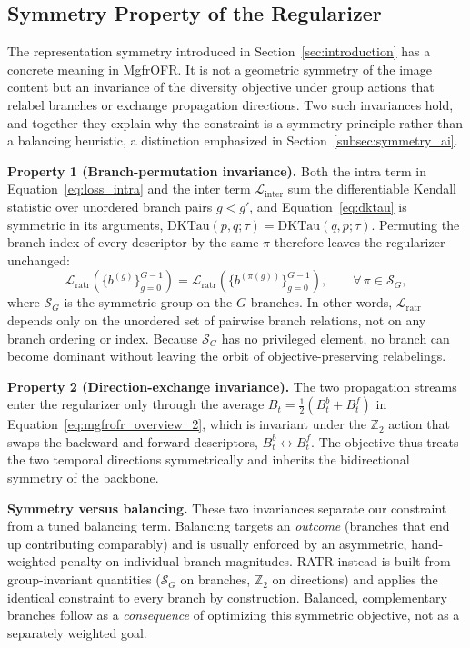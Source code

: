 \subsection{Symmetry Property of the Regularizer}
\label{subsec:symmetry_property}

The representation symmetry introduced in Section~\ref{sec:introduction} has a concrete meaning in MgfrOFR. It is not a geometric symmetry of the image content but an invariance of the diversity objective under group actions that relabel branches or exchange propagation directions. Two such invariances hold, and together they explain why the constraint is a symmetry principle rather than a balancing heuristic, a distinction emphasized in Section~\ref{subsec:symmetry_ai}.

\textbf{Property 1 (Branch-permutation invariance).} Both the intra term in Equation~\eqref{eq:loss_intra} and the inter term $\mathcal{L}_{\text{inter}}$ sum the differentiable Kendall statistic over unordered branch pairs $g<g'$, and Equation~\eqref{eq:dktau} is symmetric in its arguments, $\mathrm{DKTau}(p,q;\tau)=\mathrm{DKTau}(q,p;\tau)$. Permuting the branch index of every descriptor by the same $\pi$ therefore leaves the regularizer unchanged:
\begin{equation}
\mathcal{L}_{\text{ratr}}\!\left(\{b^{(g)}\}_{g=0}^{G-1}\right)
=
\mathcal{L}_{\text{ratr}}\!\left(\{b^{(\pi(g))}\}_{g=0}^{G-1}\right),
\qquad
\forall\,\pi\in\mathcal{S}_G,
\label{eq:branch_permutation}
\end{equation}
where $\mathcal{S}_G$ is the symmetric group on the $G$ branches. In other words, $\mathcal{L}_{\text{ratr}}$ depends only on the unordered set of pairwise branch relations, not on any branch ordering or index. Because $\mathcal{S}_G$ has no privileged element, no branch can become dominant without leaving the orbit of objective-preserving relabelings.

\textbf{Property 2 (Direction-exchange invariance).} The two propagation streams enter the regularizer only through the average $B_t=\tfrac{1}{2}(B_t^{b}+B_t^{f})$ in Equation~\eqref{eq:mgfrofr_overview_2}, which is invariant under the $\mathbb{Z}_2$ action that swaps the backward and forward descriptors, $B_t^{b}\!\leftrightarrow\!B_t^{f}$. The objective thus treats the two temporal directions symmetrically and inherits the bidirectional symmetry of the backbone.

\textbf{Symmetry versus balancing.} These two invariances separate our constraint from a tuned balancing term. Balancing targets an \emph{outcome} (branches that end up contributing comparably) and is usually enforced by an asymmetric, hand-weighted penalty on individual branch magnitudes. RATR instead is built from group-invariant quantities ($\mathcal{S}_G$ on branches, $\mathbb{Z}_2$ on directions) and applies the identical constraint to every branch by construction. Balanced, complementary branches follow as a \emph{consequence} of optimizing this symmetric objective, not as a separately weighted goal.

